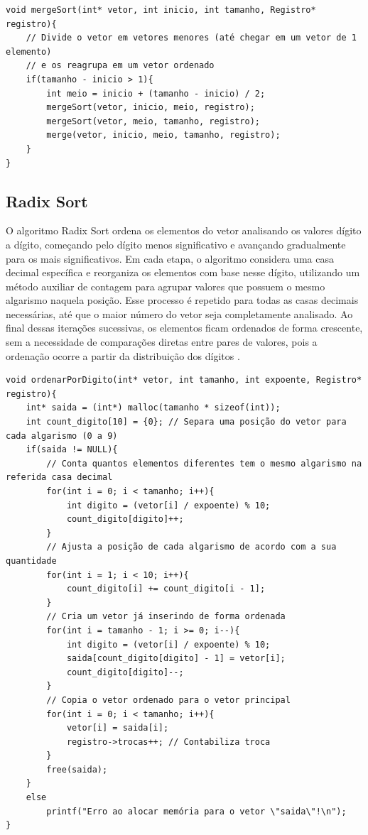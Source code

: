 \documentclass[12pt]{article}
\begin{document}
\begin{lstlisting}
void mergeSort(int* vetor, int inicio, int tamanho, Registro* registro){
    // Divide o vetor em vetores menores (até chegar em um vetor de 1 elemento) 
    // e os reagrupa em um vetor ordenado
    if(tamanho - inicio > 1){
        int meio = inicio + (tamanho - inicio) / 2;
        mergeSort(vetor, inicio, meio, registro);
        mergeSort(vetor, meio, tamanho, registro);
        merge(vetor, inicio, meio, tamanho, registro);
    }
}
\end{lstlisting}

\subsection{Radix Sort}

O algoritmo Radix Sort ordena os elementos do vetor analisando os valores dígito a dígito, começando pelo dígito menos significativo e avançando gradualmente para os mais significativos. Em cada etapa, o algoritmo considera uma casa decimal específica e reorganiza os elementos com base nesse dígito, utilizando um método auxiliar de contagem para agrupar valores que possuem o mesmo algarismo naquela posição. Esse processo é repetido para todas as casas decimais necessárias, até que o maior número do vetor seja completamente analisado. Ao final dessas iterações sucessivas, os elementos ficam ordenados de forma crescente, sem a necessidade de comparações diretas entre pares de valores, pois a ordenação ocorre a partir da distribuição dos dígitos \cite{cormen2009}.

\begin{lstlisting}
void ordenarPorDigito(int* vetor, int tamanho, int expoente, Registro* registro){
    int* saida = (int*) malloc(tamanho * sizeof(int));
    int count_digito[10] = {0};	// Separa uma posição do vetor para cada algarismo (0 a 9)
    if(saida != NULL){
        // Conta quantos elementos diferentes tem o mesmo algarismo na referida casa decimal
        for(int i = 0; i < tamanho; i++){
            int digito = (vetor[i] / expoente) % 10;
            count_digito[digito]++;
        }
        // Ajusta a posição de cada algarismo de acordo com a sua quantidade
        for(int i = 1; i < 10; i++){
            count_digito[i] += count_digito[i - 1];
        }
        // Cria um vetor já inserindo de forma ordenada
        for(int i = tamanho - 1; i >= 0; i--){
            int digito = (vetor[i] / expoente) % 10;
            saida[count_digito[digito] - 1] = vetor[i];
            count_digito[digito]--;
        }
        // Copia o vetor ordenado para o vetor principal
        for(int i = 0; i < tamanho; i++){
            vetor[i] = saida[i];
            registro->trocas++; // Contabiliza troca
        }
        free(saida);
    }
    else
        printf("Erro ao alocar memória para o vetor \"saida\"!\n");
}
\end{lstlisting}
\end{document}
